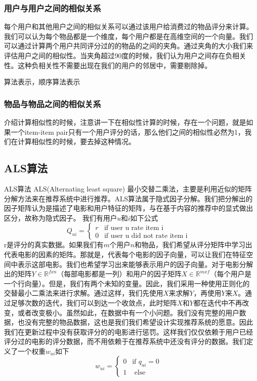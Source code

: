 \subsubsection{用户与用户之间的相似关系}
每个用户和其他用户之间的相似关系可以通过该用户给消费过的物品评分来计算。我们可以认为每个物品都是一个维度，每个用户都是在高维空间的一个向量。我们可以通过计算两个用户共同评分过的的物品的之间的夹角。通过夹角的大小我们来评估用户之间的相似性。当夹角超过90度的时候，我们认为用户之间存在负相关性。这种负相关性不需要出现在我们的用户的邻居中，需要剔除掉。

算法表示，顺序算法表示

\subsubsection{物品与物品之间的相似关系}
介绍计算相似性的时候，注意讲一下在相似性计算的时候，存在一个问题，就是如果一个item-item pair只有一个用户评分的话，那么他们之间的相似性必然为1，我们在计算相似性的时候，要去掉这种情况。
\subsection{ALS算法}
ALS算法\cite{Zachariah:2012hh}
ALS(Alternating least square) 最小交替二乘法，主要是利用近似的矩阵分解方法来在推荐系统中进行推荐。ALS算法属于隐式因子分解。我们把分解出的因子矩阵认为是描述了电影和用户特征的矩阵，与在基于内容的推荐中的显式做出区分，故称为隐式因子。
我们有用户$u$和$i$如下公式
$$
Q_{ui} = \begin{cases}
r  & \text{if user u rate item i} \\
0 & \text{if user u did not rate item i}
\end{cases}
$$
r是评分的真实数据。如果我们有$m$个用户$n$和物品，我们希望从评分矩阵中学习出代表电影的因素的矩阵。那就是，代表每个电影的因子向量，可以让我们在特征空间中表示这部电影。我们也希望学习出来能够表示用户的因子向量。对于电影分解出的矩阵$Y \in \mathbb{R}^{fxn}$（每部电影都是一列）和用户的因子矩阵$X \in \mathbb{R}^{mxf}$（每个用户是一个行向量）。但是，我们有两个未知的变量。因此，我们采用一种使用正则化的交替最小二乘法来进行求解。通过这样，我们先使用$X$来求解$Y$，再使用$Y$来$X$。通过足够次数的迭代，我们可以到达一个收敛点，此时矩阵$X$和$Y$都在迭代中不再改变，或者改变极小。虽然如此，在数据中有一个小问题。我们没有完整的用户数据，也没有完整的物品数据，这也是我们我们希望设计实现推荐系统的愿意。因此我们在更新过程中没有获取评分的的电影进行惩罚。这样我们仅仅依赖于用户已经评分过的电影的评分数据，而不用依赖于在推荐系统中还没有评分的数据。我们定义了一个权重$w_{ui}$如下
$$w_{ui} = \begin{cases}
0 &\text{if  } q_{ui} = 0 \\
1 & \text{ else} 
\end{cases}$$

